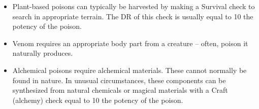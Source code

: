 \begin{itemize}
    \item {} Plant-based poisons can typically be harvested by making a Survival check to search in appropriate terrain.
        The DR of this check is usually equal to 10 \add the potency of the poison.
    \item {} Venom requires an appropriate body part from a creature -- often, poison it naturally produces.
    \item {} Alchemical poisons require alchemical materials.
        These cannot normally be found in nature.
        In unusual circumstances, these components can be synthesized from natural chemicals or magical materials with a Craft (alchemy) check equal to 10 \add the potency of the poison.
\end{itemize}
